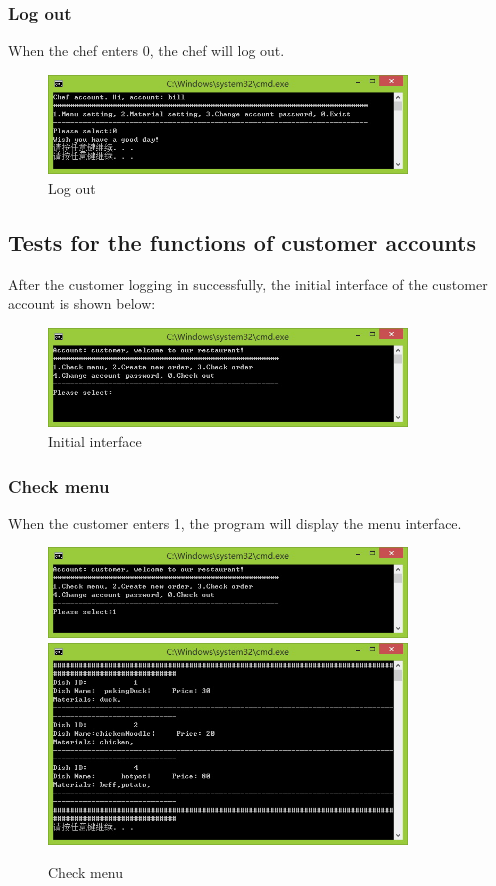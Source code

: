 \documentclass{article}
\begin{document}
\subsubsection{Log out}
When the chef enters 0, the chef will log out.
\begin{figure}[H]
    \centering
    \includegraphics[width=0.85\textwidth]{login/chefexit.jpg}
    \caption{Log out}
\end{figure}






\subsection{Tests for the functions of customer accounts}
After the customer logging in successfully, the initial interface of the customer account is shown below:
\begin{figure}[H]
    \centering
    \includegraphics[width=0.85\textwidth]{P/00.jpg}
    \caption{Initial interface}
\end{figure}

\subsubsection{Check menu}
When the customer enters 1, the program will display the menu interface.
\begin{figure}[H]
    \centering
    \includegraphics[width=0.85\textwidth]{P/P1a.jpg}
    \includegraphics[width=0.85\textwidth]{P/P1b.jpg}
    \caption{Check menu}
\end{figure}
\end{document}

